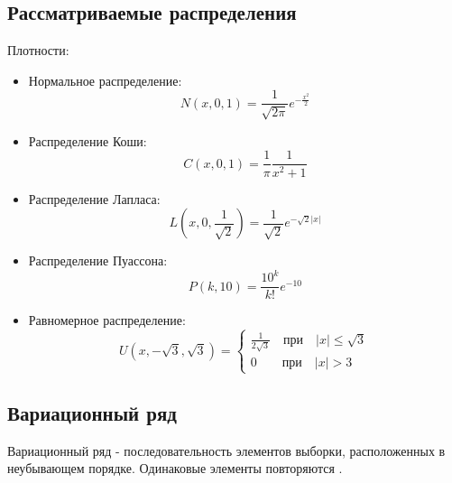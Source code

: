 \documentclass[12pt,a4paper]{article}
\begin{document}
		\subsection{Рассматриваемые распределения}
		Плотности:
			\begin{itemize}
				\item Нормальное распределение:
				\begin{equation}\label{norm}
					\textit{N}(\textit{x}, 0, 1)=\frac{1}{\sqrt{2\pi}}e^{-\frac{x^2}{2}}
				\end{equation}
				
				\item Распределение Коши:
				\begin{equation}\label{cauchy}
					\textit{C}(\textit{x}, 0, 1)=\frac{1}{\pi}\frac{1}{x^2+1}
				\end{equation}
				
				\item Распределение Лапласа:
				\begin{equation}\label{laplace}
					\textit{L}(\textit{x}, 0, \frac{1}{\sqrt{2}})=\frac{1}{\sqrt{2}}e^{-\sqrt{2}|x|}
				\end{equation}
				
				\item Распределение Пуассона:
				\begin{equation}\label{poisson}
					\textit{P}(\textit{k}, 10)=\frac{10^k}{k!}e^{-10}
				\end{equation}
				
				\item Равномерное распределение:
				\begin{equation}\label{uniform}
					\textit{U}(\textit{x}, -\sqrt{3}, \sqrt{3})=
					\left\{
					\begin{array}{l}
						\frac{1}{2\sqrt{3}} \quad \text{при} \quad |x|\leq \sqrt{3}\\
						0 \quad \quad \text{при} \quad |x|>3
					\end{array}
					\right.
				\end{equation}
			\end{itemize}
		 	
	 
		\subsection{Вариационный ряд}
			Вариационный ряд - последовательность элементов выборки, расположенных в неубывающем порядке. Одинаковые элементы повторяются \cite{num_chars}.
			
\end{document}
